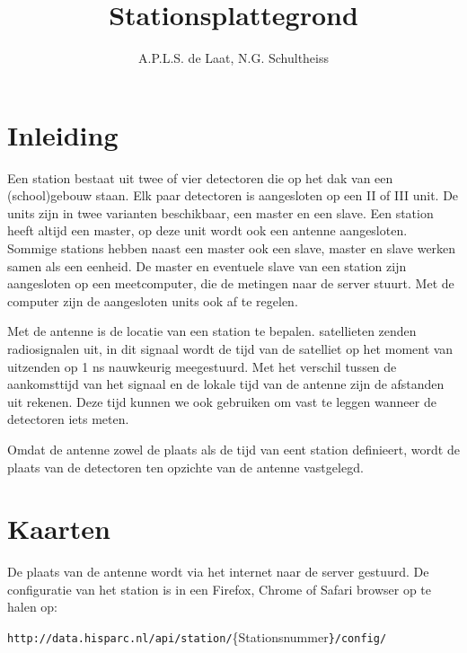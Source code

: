 

\title{Stationsplattegrond}
\author{A.P.L.S. de Laat, N.G. Schultheiss}



\maketitle

\section{Inleiding}

Een \hisparc station bestaat uit twee of vier detectoren die op het dak
van een (school)gebouw staan. Elk paar detectoren is aangesloten op een
\hisparc II of \hisparc III unit. De \hisparc units zijn in twee
varianten beschikbaar, een master en een slave. Een \hisparc station
heeft altijd een \hisparc master, op deze unit wordt ook een \gps antenne
aangesloten. Sommige stations hebben naast een master ook een slave,
master en slave werken samen als een eenheid. De master en eventuele
slave van een station zijn aangesloten op een meetcomputer, die de
metingen naar de \hisparc server stuurt. Met de computer zijn de
aangesloten units ook af te regelen.

Met de \gps antenne is de locatie van een station te bepalen.
\gps satellieten zenden radiosignalen uit, in dit signaal wordt de tijd
van de satelliet op het moment van uitzenden op 1 ns nauwkeurig meegestuurd.
Met het verschil tussen de aankomsttijd van het signaal en de lokale
tijd van de antenne zijn de afstanden uit rekenen. Deze tijd kunnen we
ook gebruiken om  vast te leggen wanneer de detectoren iets meten. 

Omdat de \gps antenne zowel de plaats als de tijd van eent station definieert,
wordt de plaats van de detectoren ten opzichte van de \gps antenne
vastgelegd.


\section{Kaarten}

De plaats van de \gps antenne wordt via het internet naar de \hisparc
server gestuurd. De configuratie van het station is in een Firefox,
Chrome of Safari browser op te halen op: 

\texttt{\small{http://data.hisparc.nl/api/station/}}{\small{\{Stationsnummer}}\texttt{\small{\}/config/}}{\small \par}

